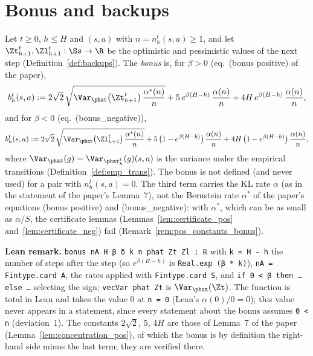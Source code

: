 \section{Bonus and backups}
\label{sec:algorithm_backups}

\begin{definition}\label{def:bonus}
\leanok
{}
Let $t \ge 0$, $h \le H$ and $(s, a)$ with $n = n_h^t(s, a) \ge 1$, and let $\Zt^t_{h+1}, \Zl^t_{h+1} : \Ss \to \R$
be the optimistic and pessimistic values of the next step (Definition~\ref{def:backups}). The
\emph{bonus} is, for $\beta > 0$ (eq.~(bonus positive) of the paper),
\[
  b_h^t(s, a) := 2\sqrt2\, \sqrt{\Var_{\phat}\big(\Zt^t_{h+1}\big)\, \frac{\alpha^*(n)}{n}}
  + 5\, e^{\beta(H - h)}\, \frac{\alpha(n)}{n}
  + 4 H\, e^{\beta(H - h)}\, \frac{\alpha(n)}{n} ,
\]
and for $\beta < 0$ (eq.~(bonus\_negative)),
\[
  b_h^t(s, a) := 2\sqrt2\, \sqrt{\Var_{\phat}\big(\Zl^t_{h+1}\big)\, \frac{\alpha^*(n)}{n}}
  + 5\, \big(1 - e^{\beta(H - h)}\big)\, \frac{\alpha(n)}{n}
  + 4 H\, \big(1 - e^{\beta(H - h)}\big)\, \frac{\alpha(n)}{n} ,
\]
where $\Var_{\phat}(g) = \Var_{\phat_h^t}(g)(s, a)$ is the variance under the empirical
transitions (Definition~\ref{def:emp_trans}). The bonus is not defined (and never used) for a
pair with $n_h^t(s, a) = 0$. The third term carries the KL rate $\alpha$ (as in the statement of
the paper's Lemma~7), not the Bernstein rate $\alpha^*$ of the paper's equations
(bonus positive) and (bonus\_negative): with $\alpha^*$, which can be as small as $\alpha/S$,
the certificate lemmas (Lemmas~\ref{lem:certificate_pos} and~\ref{lem:certificate_neg}) fail
(Remark~\ref{rem:pos_constants_bonus}).
\end{definition}

\textbf{Lean remark.} \texttt{bonus nA H β δ k n phat Zt Zl : ℝ} with \texttt{k = H - h} the
number of steps after the step (so $e^{\beta(H - h)}$ is \texttt{Real.exp (β * k)}),
\texttt{nA = Fintype.card A}, the rates applied with \texttt{Fintype.card S}, and
\texttt{if 0 < β then … else …} selecting the sign; \texttt{vecVar phat Zt} is $\Var_{\phat}(\Zt)$.
The function is total in Lean and takes the value $0$ at \texttt{n = 0} (Lean's $\alpha(0)/0 = 0$);
this value never appears in a statement, since every statement about the bonus assumes
\texttt{0 < n} (deviation~1). The constants $2\sqrt2$, $5$, $4H$ are those of Lemma~7 of the
paper (Lemma~\ref{lem:concentration_pos}), of which the bonus is by definition the right-hand
side minus the last term; they are verified there.

